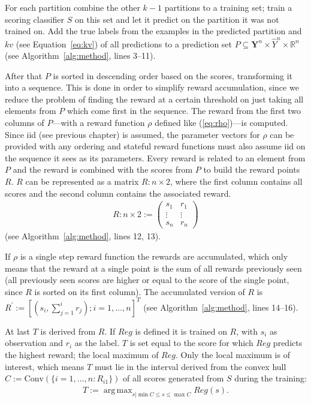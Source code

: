 \documentclass[twoside,11pt]{article}
\DeclareMathOperator*{\argmax}{arg\,max}
\def\Y{\textbf{Y}}
\begin{document}
For each partition combine the other $k-1$ partitions to a
training set; train a scoring classifier $S$ on this
set and let it predict on the partition it was not trained
on.
Add the true labels from the examples in the predicted
partition and $kv$ (see Equation~\ref{eq:kv}) of all
predictions to a prediction set
$P \subseteq \Y^n \times \hat{Y}^n \times \mathbb{R}^n$
(see Algorithm~\ref{alg:method}, lines 3--11).

After that $P$ is sorted in descending order based on the
scores, transforming it into a sequence.
This is done in order to simplify reward accumulation,
since we reduce the problem of finding the reward at a
certain threshold on just taking all elements from $P$
which come first in the sequence.
The reward from the first two columns of $P$---with a
reward function $\rho$ defined like (\ref{eq:rho})---is
computed.
Since iid (see previous chapter) is assumed, the parameter
vectors for $\rho$ can be provided with any ordering and
stateful reward functions must also assume iid on the
sequence it sees as its parameters.
Every reward is related to an element from $P$ and the
reward is combined with the scores from $P$ to build the
reward points $R$. $R$ can be represented as a matrix
$R: n \times 2$, where the first column contains all scores
and the second column contains the associated reward.
\begin{align*}
  R: n \times 2 :=
    \begin{pmatrix}
      s_1 &r_1 \\
      \vdots &\vdots \\
      s_n &r_n
    \end{pmatrix}
\end{align*}
(see Algorithm~\ref{alg:method}, lines 12, 13).

If $\rho$ is a single step reward function the rewards
are accumulated, which only means that the reward at a
single point is the sum of all rewards previously seen
(all previously seen scores are higher or equal to the
score of the single point, since $R$ is sorted on its
first column).
The accumulated version of $R$ is
$R^\prime := [(s_i, \sum_{j=1}^{i} r_j); i=1,\dots,n]^T$
(see Algorithm~\ref{alg:method}, lines 14--16).

At last $T$ is derived from $R$. If $Reg$ is defined it
is trained on $R$, with $s_i$ as observation and $r_i$ as
the label. $T$ is set equal to the score for which $Reg$
predicts the highest reward; the local maximum of $Reg$.
Only the local maximum is of interest, which means $T$
must lie in the interval derived from the convex hull
$C := \text{Conv}(\{i=1,\dots,n:R_{i1}\})$ of
all scores generated from $S$ during the training:
\begin{align}
  \label{eq:T_Reg}
  T := \argmax_{s | \min C \leq s \leq \max C} Reg(s).
\end{align}
\end{document}

